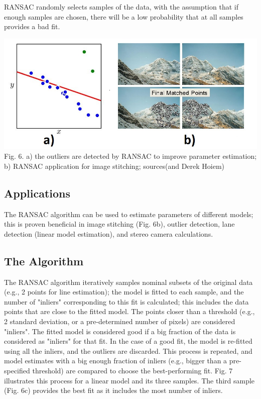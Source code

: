 \documentclass{article}
\begin{document}
RANSAC randomly selects samples of the data, with the assumption that if enough samples are chosen, there will be a low probability that at all samples provides a bad fit.

\includegraphics[width=\textwidth]{ransac1.jpg}
Fig. 6. a) the outliers are detected by RANSAC to improve parameter estimation; b) RANSAC application for image stitching; sources(\cite{prince2012computer}and Derek Hoiem)

\subsection{Applications}
The RANSAC algorithm can be used to estimate parameters of different models; this is proven beneficial in image stitching (Fig. 6b), outlier detection, lane detection (linear model estimation), and stereo camera calculations.

\subsection{The Algorithm}
The RANSAC algorithm iteratively samples nominal subsets of the original data (e.g., 2 points for line estimation); the model is fitted to each sample, and the number of "inliers" corresponding to this fit is calculated; this includes the data points that are close to the fitted model. The points closer than a threshold (e.g., 2 standard deviation, or a pre-determined number of pixels) are considered "inliers". The fitted model is considered good if a big fraction of the data is considered as "inliers" for that fit. In the case of a good fit, the model is re-fitted using all the inliers, and the outliers are discarded. This process is repeated, and model estimates with a big enough fraction of inliers (e.g., bigger than a pre-specified threshold) are compared to choose the best-performing fit. Fig. 7 illustrates this process for a linear model and its three samples. The third sample (Fig. 6c) provides the best fit as it includes the most number of inliers.
\end{document}
